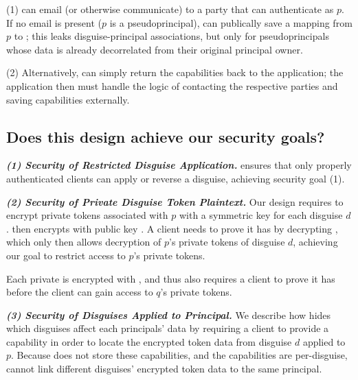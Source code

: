 (1) \sys can email (or otherwise communicate)
 to a party that can authenticate as $p$. If no email is present (\eg $p$ is a pseudoprincipal),
\sys can publically save a mapping from $p$ to ; this leaks disguise-principal associations, but
only for pseudoprincipals whose data is already decorrelated from their original principal owner.

(2) Alternatively, \sys can simply return the capabilities back to the application; the application
then must handle the logic of contacting the respective parties and saving capabilities externally.

\subsection{Does this design achieve our security goals?}
\label{sec:achievegoals}
\vspace{6pt}\noindent\textbf{\emph{(1) Security of Restricted Disguise Application.}}
\sys ensures that only properly authenticated clients can apply or
reverse a disguise, achieving security goal (1).

\vspace{6pt}\noindent\textbf{\emph{(2) Security of Private Disguise Token Plaintext.}}
Our design requires \sys to encrypt private \tdata{} tokens associated with $p$ with a symmetric key
 for each disguise $d$. \sys then encrypts  with public key .  
A client needs to prove it has  by decrypting , which only then allows decryption
of $p$'s private tokens of disguise $d$, achieving our goal to restrict access to $p$'s private
tokens.

Each private  is encrypted with , and thus also requires a client to prove it has
 before the client can gain access to $q$'s private tokens.

\vspace{6pt}\noindent\textbf{\emph{(3) Security of Disguises Applied to Principal.}}
We describe how \sys hides which disguises affect each principals' data by requiring a client to
provide a capability  in order to locate the encrypted token data from disguise $d$ applied
to $p$. Because \sys does not store these capabilities, and the capabilities are per-disguise, \sys
cannot link different disguises' encrypted token data to the same principal.

